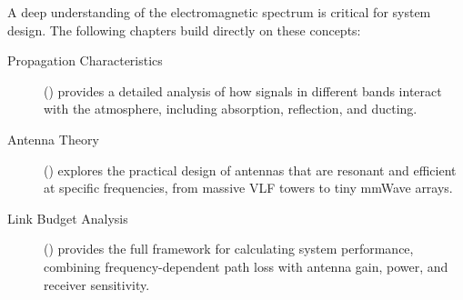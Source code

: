 \begin{importantbox}[title={Further Reading}]
    A deep understanding of the electromagnetic spectrum is critical for system design. The following chapters build directly on these concepts:
    \begin{description}
        \item[Propagation Characteristics] () provides a detailed analysis of how signals in different bands interact with the atmosphere, including absorption, reflection, and ducting.
        \item[Antenna Theory] () explores the practical design of antennas that are resonant and efficient at specific frequencies, from massive VLF towers to tiny mmWave arrays.
        \item[Link Budget Analysis] () provides the full framework for calculating system performance, combining frequency-dependent path loss with antenna gain, power, and receiver sensitivity.
    \end{description}
\end{importantbox}